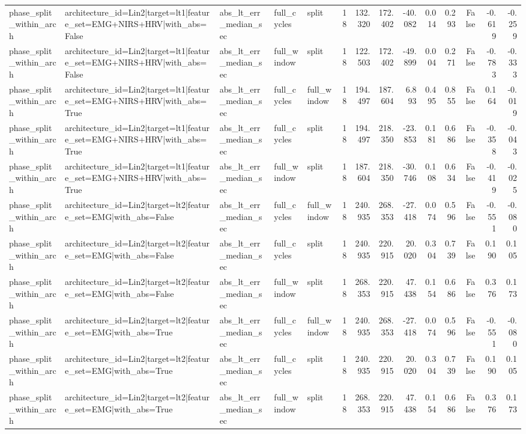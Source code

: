 \begin{table}
\begin{tabular}{lllllrrrrrrrrr}
phase_split_within_arch & architecture_id=Lin2|target=lt1|feature_set=EMG+NIRS+HRV|with_abs=False & abs_lt_err_median_sec & full_cycles & split & 18 & 132.320 & 172.402 & -40.082 & 0.014 & 0.293 & False & -0.619 & -0.259 \\
phase_split_within_arch & architecture_id=Lin2|target=lt1|feature_set=EMG+NIRS+HRV|with_abs=False & abs_lt_err_median_sec & full_window & split & 18 & 122.503 & 172.402 & -49.899 & 0.004 & 0.271 & False & -0.783 & -0.333 \\
phase_split_within_arch & architecture_id=Lin2|target=lt1|feature_set=EMG+NIRS+HRV|with_abs=True & abs_lt_err_median_sec & full_cycles & full_window & 18 & 194.497 & 187.604 & 6.893 & 0.495 & 0.855 & False & 0.164 & -0.019 \\
phase_split_within_arch & architecture_id=Lin2|target=lt1|feature_set=EMG+NIRS+HRV|with_abs=True & abs_lt_err_median_sec & full_cycles & split & 18 & 194.497 & 218.350 & -23.853 & 0.181 & 0.686 & False & -0.358 & -0.043 \\
phase_split_within_arch & architecture_id=Lin2|target=lt1|feature_set=EMG+NIRS+HRV|with_abs=True & abs_lt_err_median_sec & full_window & split & 18 & 187.604 & 218.350 & -30.746 & 0.108 & 0.634 & False & -0.419 & -0.025 \\
phase_split_within_arch & architecture_id=Lin2|target=lt2|feature_set=EMG|with_abs=False & abs_lt_err_median_sec & full_cycles & full_window & 18 & 240.935 & 268.353 & -27.418 & 0.074 & 0.596 & False & -0.551 & -0.080 \\
phase_split_within_arch & architecture_id=Lin2|target=lt2|feature_set=EMG|with_abs=False & abs_lt_err_median_sec & full_cycles & split & 18 & 240.935 & 220.915 & 20.020 & 0.304 & 0.739 & False & 0.190 & 0.105 \\
phase_split_within_arch & architecture_id=Lin2|target=lt2|feature_set=EMG|with_abs=False & abs_lt_err_median_sec & full_window & split & 18 & 268.353 & 220.915 & 47.438 & 0.154 & 0.686 & False & 0.376 & 0.173 \\
phase_split_within_arch & architecture_id=Lin2|target=lt2|feature_set=EMG|with_abs=True & abs_lt_err_median_sec & full_cycles & full_window & 18 & 240.935 & 268.353 & -27.418 & 0.074 & 0.596 & False & -0.551 & -0.080 \\
phase_split_within_arch & architecture_id=Lin2|target=lt2|feature_set=EMG|with_abs=True & abs_lt_err_median_sec & full_cycles & split & 18 & 240.935 & 220.915 & 20.020 & 0.304 & 0.739 & False & 0.190 & 0.105 \\
phase_split_within_arch & architecture_id=Lin2|target=lt2|feature_set=EMG|with_abs=True & abs_lt_err_median_sec & full_window & split & 18 & 268.353 & 220.915 & 47.438 & 0.154 & 0.686 & False & 0.376 & 0.173 \\

\end{tabular}
\end{table}
